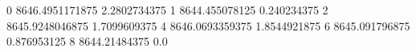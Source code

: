 0 8646.4951171875 2.2802734375
1 8644.455078125 0.240234375
2 8645.9248046875 1.7099609375
4 8646.0693359375 1.8544921875
6 8645.091796875 0.876953125
8 8644.21484375 0.0
